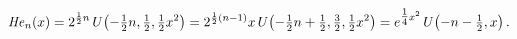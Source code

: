 \[\mathop{\mathit{He}_{n}\/}\nolimits\!\left(x\right)=2^{\frac{1}{2}n}\mathop{U%
\/}\nolimits\!\left(-\tfrac{1}{2}n,\tfrac{1}{2},\tfrac{1}{2}x^{2}\right)=2^{%
\frac{1}{2}(n-1)}x\mathop{U\/}\nolimits\!\left(-\tfrac{1}{2}n+\tfrac{1}{2},%
\tfrac{3}{2},\tfrac{1}{2}x^{2}\right)=e^{\tfrac{1}{4}x^{2}}\mathop{U\/}%
\nolimits\!\left(-n-\tfrac{1}{2},x\right).\]